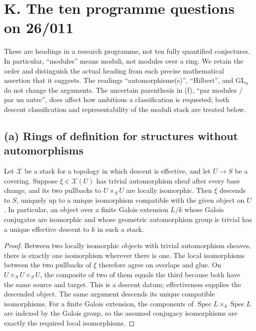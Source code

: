 \section{K. The ten programme questions on 26/011}
\label{sec:geometry-K}

These are headings in a research programme, not ten fully quantified
conjectures. In particular, ``modules'' means moduli, not modules over a
ring. We retain the order and distinguish the actual heading from each
precise mathematical assertion that it suggests. The readings
``automorphisme(s)'', ``Hilbert'', and $\mathrm{GL}_n$ do not change the
arguments. The uncertain parenthesis in (f), ``par modules / par un autre'',
does affect how ambitious a classification is requested; both descent
classification and representability of the moduli stack are treated below.

\subsection{(a) Rings of definition for structures without automorphisms}

\begin{proposition}
\label{geo-Ka}
Let $\mathcal X$ be a stack for a topology in which descent is effective,
and let $U\to S$ be a covering. Suppose $\xi\in\mathcal X(U)$ has trivial
automorphism sheaf after every base change, and its two pullbacks to
$U\times_S U$ are locally isomorphic. Then $\xi$ descends to $S$, uniquely
up to a unique isomorphism compatible with the given object on $U$.
In particular, an object over a finite Galois extension $L/k$ whose Galois
conjugates are isomorphic and whose geometric automorphism group is trivial
has a unique effective descent to $k$ in such a stack.
\end{proposition}
\begin{proof}
Between two locally isomorphic objects with trivial automorphism sheaves,
there is exactly one isomorphism wherever there is one. The local
isomorphisms between the two pullbacks of $\xi$ therefore agree on overlaps
and glue. On $U\times_S U\times_S U$, the composite of two of them equals
the third because both have the same source and target. This is a descent
datum; effectiveness supplies the descended object. The same argument
descends its unique compatible isomorphisms. For a finite Galois extension,
the components of $\operatorname{Spec}L\times_k\operatorname{Spec}L$ are
indexed by the Galois group, so the assumed conjugacy isomorphisms are
exactly the required local isomorphisms.
\end{proof}

